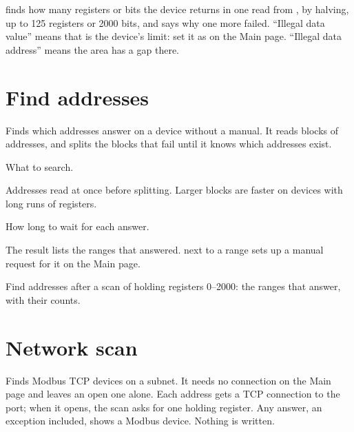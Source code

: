  finds how many registers or bits the device returns in
one read from , by halving, up to 125 registers or 2000 bits,
and says why one more failed. ``Illegal data value'' means that is the
device's limit: set it as  on the Main page. ``Illegal data
address'' means the area has a gap there.

\section{Find addresses}

Finds which addresses answer on a device without a manual. It reads blocks of
addresses, and splits the blocks that fail until it knows which addresses
exist.

\begin{description}[style=nextline, leftmargin=0pt, font=\intermedium]
  \item[Area, From, To] What to search.
  \item[Block] Addresses read at once before splitting. Larger blocks are
    faster on devices with long runs of registers.
  \item[Wait (ms)] How long to wait for each answer.
\end{description}

The result lists the ranges that answered.  next to a range sets up
a manual request for it on the Main page.

  {Find addresses after a scan of holding registers 0--2000: the ranges that
   answer, with their counts.}

\section{Network scan}
\label{sec:network-scan}

Finds Modbus TCP devices on a subnet. It needs no connection on the Main page
and leaves an open one alone. Each address gets a TCP connection to the port;
when it opens, the scan asks for one holding register. Any answer, an exception
included, shows a Modbus device. Nothing is written.

